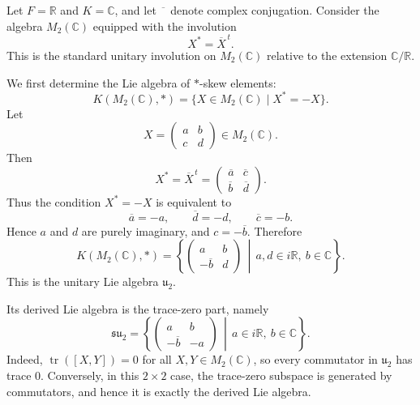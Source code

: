 \begin{example}
    Let $F=\mathbb{R}$ and $K=\mathbb{C}$, and let $\overline{\phantom{x}}$ denote complex conjugation.
    Consider the algebra $M_{2}(\mathbb{C})$ equipped with the involution
    \[
        X^{*}=\overline{X}^{\,t}.
    \]
    This is the standard unitary involution on $M_{2}(\mathbb{C})$ relative to the extension
    $\mathbb{C}/\mathbb{R}$.

    We first determine the Lie algebra of $*$-skew elements:
    \[
        K(M_{2}(\mathbb{C}),*)=\{X\in M_{2}(\mathbb{C})\mid X^{*}=-X\}.
    \]
    Let
    \[
        X=\begin{pmatrix}a&b\\ c&d\end{pmatrix}\in M_{2}(\mathbb{C}).
    \]
    Then
    \[
        X^{*}
        =
        \overline{X}^{\,t}
        =
        \begin{pmatrix}
            \overline{a} & \overline{c} \\
            \overline{b} & \overline{d}
        \end{pmatrix}.
    \]
    Thus the condition $X^{*}=-X$ is equivalent to
    \[
        \overline{a}=-a,\qquad \overline{d}=-d,\qquad \overline{c}=-b.
    \]
    Hence $a$ and $d$ are purely imaginary, and $c=-\overline{b}$. Therefore
    \[
        K(M_{2}(\mathbb{C}),*)
        =
        \left\{
        \begin{pmatrix}
            a             & b \\
            -\overline{b} & d
        \end{pmatrix}
        \,\middle|\,
        a,d\in i\mathbb{R},\ b\in\mathbb{C}
        \right\}.
    \]
    This is the unitary Lie algebra $\mathfrak{u}_{2}$.

    Its derived Lie algebra is the trace-zero part, namely
    \[
        \mathfrak{su}_{2}
        =
        \left\{
        \begin{pmatrix}
            a             & b  \\
            -\overline{b} & -a
        \end{pmatrix}
        \,\middle|\,
        a\in i\mathbb{R},\ b\in\mathbb{C}
        \right\}.
    \]
    Indeed, $\operatorname{tr}([X,Y])=0$ for all $X,Y\in M_{2}(\mathbb{C})$, so every commutator in
    $\mathfrak{u}_{2}$ has trace $0$. Conversely, in this $2\times2$ case, the trace-zero subspace is
    generated by commutators, and hence it is exactly the derived Lie algebra.


\end{example}
